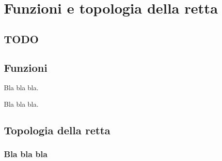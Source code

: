 


\chapter{Funzioni e topologia della retta}

\section{TODO}
\begin{comment}
 
Schema del capitolo
===================


\end{comment}

\begin{comment}
\begin{center}
\begin{inaccessibleblock}[TODO.]
  \telescopio
\end{inaccessibleblock}
\end{center}
\end{comment}

\begin{center}
\begin{inaccessibleblock}[TODO.]
%   
\end{inaccessibleblock}
\end{center}

\section{Funzioni}
\label{sec:cont_limiti}

Bla bla bla.

\begin{definizione}
Bla bla bla.
\end{definizione}


\section{Topologia della retta}
\label{sec:cont_continuita}

\subsection{Bla bla bla}
\label{subsec:cont_definizione}


